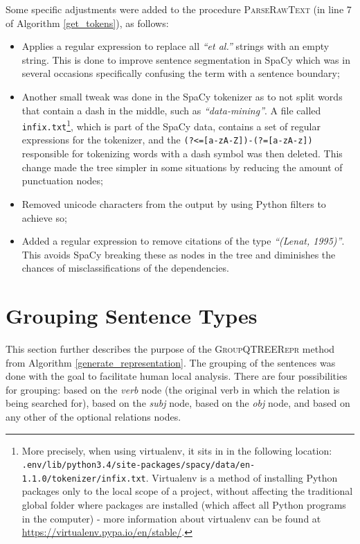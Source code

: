 \documentclass[11pt,a4paper,openright]{memoir}
\begin{document}
Some specific adjustments were added to the procedure \textsc{ParseRawText} (in line 7 of Algorithm \ref{get_tokens}), as follows:
\begin{itemize}
  \item Applies a regular expression to replace all \emph{\enquote{et al.}} strings with an empty string. This is done to improve sentence segmentation in SpaCy which was in several occasions specifically confusing the term with a sentence boundary;
  \item Another small tweak was done in the SpaCy tokenizer as to not split words that contain a dash in the middle, such as \emph{\enquote{data-mining}}. A file called \texttt{infix.txt}\footnote{More precisely, when using virtualenv, it sits in in the following location: \texttt{.env/lib/python3.4/site-packages/spacy/data/en-1.1.0/tokenizer/infix.txt}. Virtualenv is a method of installing Python packages only to the local scope of a project, without affecting the traditional global folder where packages are installed (which affect all Python programs in the computer) - more information about virtualenv can be found at \url{https://virtualenv.pypa.io/en/stable/}.}, which is part of the SpaCy data, contains a set of regular expressions for the tokenizer, and the \texttt{(?<=[a-zA-Z])-(?=[a-zA-z])} responsible for tokenizing words with a dash symbol was then deleted. This change made the tree simpler in some situations by reducing the amount of punctuation nodes;
  \item Removed unicode characters from the output by using Python filters to achieve so;
  \item Added a regular expression to remove citations of the type \emph{\enquote{(Lenat, 1995)}}. This avoids SpaCy breaking these as nodes in the tree and diminishes the chances of misclassifications of the dependencies.
\end{itemize}



%
%
%
%

\section{Grouping Sentence Types}
\label{section:grouping}

This section further describes the purpose of the \textsc{GroupQTREERepr} method from Algorithm \ref{generate_representation}. The grouping of the sentences was done with the goal to facilitate human local analysis. There are four possibilities for grouping: based on the \emph{verb} node (the original verb in which the relation is being searched for), based on the \emph{subj} node, based on the \emph{obj} node, and based on any other of the optional relations nodes.
\end{document}
